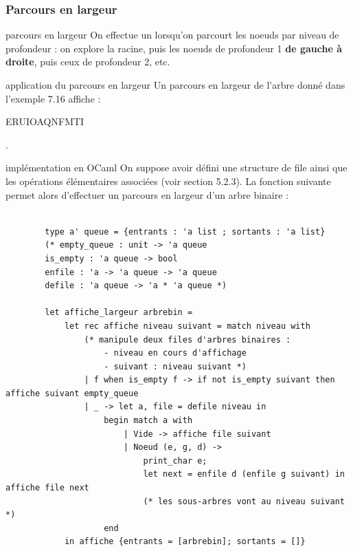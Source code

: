 \subsubsection{Parcours en largeur}

\begin{definition}{7.20}{parcours en largeur}
On effectue un  lorsqu'on parcourt les noeuds par niveau de profondeur : on explore la racine, puis les noeuds de profondeur 1 \textbf{de gauche à droite}, puis ceux de profondeur 2, etc.
\end{definition}

\begin{exemple}{7.21}{application du parcours en largeur}
    Un parcours en largeur de l'arbre donné dans l'exemple 7.16 affiche : \\ \begin{center}ERUIOAQNFMTI\end{center}.
\end{exemple}

\begin{exemple}{7.22}{implémentation en OCaml}
    On suppose avoir défini une structure de file ainsi que les opérations élémentaires associées (voir section 5.2.3). La fonction suivante permet alors d'effectuer un parcours en largeur d'un arbre binaire : \\ \\
    \begin{verbatim}
        type a' queue = {entrants : 'a list ; sortants : 'a list}
        (* empty_queue : unit -> 'a queue
        is_empty : 'a queue -> bool
        enfile : 'a -> 'a queue -> 'a queue
        defile : 'a queue -> 'a * 'a queue *)
    
        let affiche_largeur arbrebin = 
            let rec affiche niveau suivant = match niveau with 
                (* manipule deux files d'arbres binaires :  
                    - niveau en cours d'affichage
                    - suivant : niveau suivant *)
                | f when is_empty f -> if not is_empty suivant then affiche suivant empty_queue
                | _ -> let a, file = defile niveau in 
                    begin match a with 
                        | Vide -> affiche file suivant 
                        | Noeud (e, g, d) -> 
                            print_char e; 
                            let next = enfile d (enfile g suivant) in affiche file next 
                            (* les sous-arbres vont au niveau suivant *)
                    end
            in affiche {entrants = [arbrebin]; sortants = []}
    \end{verbatim}
\end{exemple}

